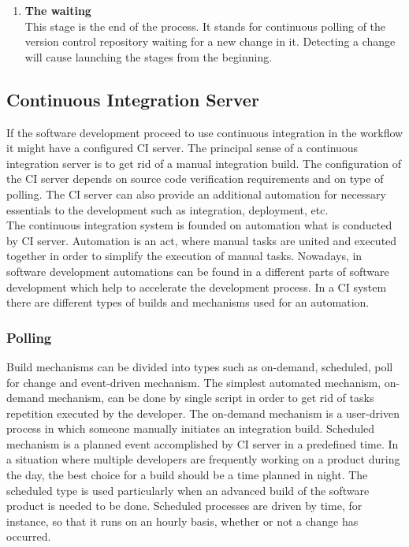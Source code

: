 \begin{enumerate}
	\item \textbf{The waiting}\\[0.1em]
		  This stage is the end of the process. It stands for continuous polling of  the version control repository waiting for a new change in it. Detecting a change will cause launching the stages from the beginning.

\end{enumerate}

\subsection{Continuous Integration Server}

If the software development proceed to use continuous integration in the workflow it might have a configured CI server. The principal sense of a continuous integration server is to get rid of a manual integration build. The configuration of the CI server depends on source code verification requirements and on type of polling. The CI server can also provide an additional automation for necessary essentials to the development such as integration, deployment, etc.\\

The continuous integration system is founded on automation what is conducted by CI server. Automation is an act, where manual tasks are united and executed together in order to simplify the execution of manual tasks. Nowadays, in software development automations can be found in a different parts of software development which help to accelerate the development process. In a CI system there are different types of builds and mechanisms used for an automation.

\subsubsection{Polling}

Build mechanisms can be divided into types such as on-demand, scheduled, poll for change and event-driven mechanism\cite{CIPD}. The simplest automated mechanism, on-demand mechanism, can be done by single script in order to get rid of tasks repetition executed by the developer. The on-demand mechanism is a user-driven process in which someone manually initiates an integration build\cite{CIPD}. Scheduled mechanism is a planned event accomplished by CI server in a predefined time. In a situation where multiple developers are frequently working on a product during the day, the best choice for a build should be a time planned in night. The scheduled type is used particularly when an advanced build of the software product is needed to be done. Scheduled processes are driven by time, for instance, so that it runs on an hourly basis, whether or not a change has occurred\cite{CIPD}.\\

